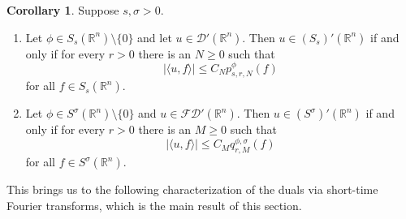 \documentclass[11pt,a4paper,reqno]{amsart}
\numberwithin{equation}{section}
\theoremstyle{definition}
\newtheorem{cor}[thm]{Corollary}
\theoremstyle{definition}
\begin{document}
\begin{cor}
Suppose $s,\sigma > 0$.
\begin{enumerate}[label=(\roman*)]
    \item Let $\phi\in S_s(\mathbb{R}^n)\setminus\{0\}$ and let $u\in \mathscr{D}'(\mathbb{R}^n)$. Then $u\in (S_s)'(\mathbb{R}^n)$ if and only if for every $r>0$ there is an $N\geq 0$ such that
    \begin{equation*}
        |\langle u, f \rangle|\leq C_N p^{\phi}_{s,r,N}(f)
    \end{equation*}
    for all $f\in S_s(\mathbb{R}^n)$.
    \item Let $\phi\in S^\sigma(\mathbb{R}^n)\setminus\{0\}$ and $u\in\mathscr{F}\mathscr{D}'(\mathbb{R}^n)$. Then $u\in (S^\sigma)'(\mathbb{R}^n)$ if and only if for every $r>0$ there is an $M\geq 0$ such that
    \begin{equation*}
        |\langle u, f \rangle|\leq C_M q^{\phi,\sigma}_{r,M}(f)
    \end{equation*}
    for all $f\in S^\sigma (\mathbb{R}^n)$.
\end{enumerate}
\end{cor}

This brings us to the following characterization of the duals via short-time Fourier transforms, which is the main result of this section.
\end{document}
